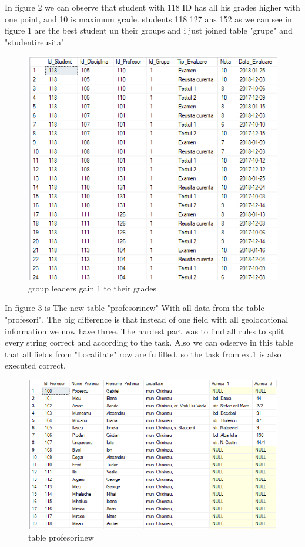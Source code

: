 \documentclass[12pt]{article}
\begin{document}
       In figure 2 we can observe that student with 118 ID has all his grades higher with one point, and 10 is maximum grade. students 118 127 ans 152 as we can see in figure 1 are the best student un their groups and i just joined table "grupe" and "studentireusita"
        \begin{figure}[H]
                \centering
                \includegraphics[width=.9\textwidth]{img4.png}
                \caption{group leaders gain  1 to their grades}
        \end{figure}
        \vspace{0.5 cm}

        In figure 3 is The new table "profesorinew" With all data from the table "profesori". The big difference is that instead of one field with all geolocational  information we now have three. The hardest part was to find all rules to split every string correct and according to the task. Also we can odserve in this table that all fields from "Localitate" row are fulfilled, so the task from ex.1 is also executed correct.
        \begin{figure}[H]
                \centering
                \includegraphics[width = \textwidth]{img5.png}
                \caption{table profesorinew}
        \end{figure}
        \vspace{0.5 cm}
\end{document}
